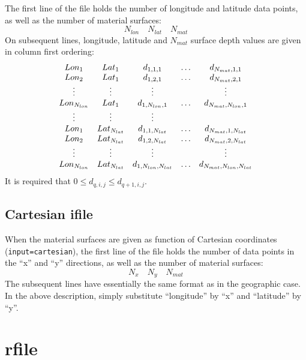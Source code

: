 \documentclass[11pt]{report}
\begin{document}
{The first line of the file holds the number of longitude and latitude data points, as well as the number
of material surfaces:
\[
	N_{lon}\quad N_{lat}\quad N_{mat}
\]
On subsequent lines, longitude, latitude and $N_{mat}$ surface depth values are given in column
first ordering:
\[
	\begin{array}{c c c c c}
		Lon_1         & Lat_1         & d_{1,1,1}             & \ldots & d_{N_{mat},1,1}             \\
		Lon_2         & Lat_1         & d_{1,2,1}             & \ldots & d_{N_{mat},2,1}             \\
		\vdots        & \vdots        & \vdots                &        & \vdots                      \\
		Lon_{N_{lon}} & Lat_1         & d_{1,N_{lon},1}       & \ldots & d_{N_{mat},N_{lon},1}       \\
		\vdots        & \vdots        & \vdots                                                       \\
		Lon_1         & Lat_{N_{lat}} & d_{1,1,N_{lat}}       & \ldots & d_{N_{mat},1,N_{lat}}       \\
		Lon_2         & Lat_{N_{lat}} & d_{1,2,N_{lat}}       & \ldots & d_{N_{mat},2,N_{lat}}       \\
		\vdots        & \vdots        & \vdots                &        & \vdots                      \\
		Lon_{N_{lon}} & Lat_{N_{lat}} & d_{1,N_{lon},N_{lat}} & \ldots & d_{N_{mat},N_{lon},N_{lat}}
	\end{array}
\]
It is required that $0\leq d_{q,i,j} \leq d_{q+1,i,j}$.

\subsection{Cartesian ifile}

When the material surfaces are given as function of Cartesian coordinates (\verb+input=cartesian+),
the first line of the file holds the number of data points in the ``x'' and ``y'' directions, as
well as the number of material surfaces:
\[
	N_{x}\quad N_{y}\quad N_{mat}
\]
The subsequent lines have essentially the same format as in the geographic case. In the above
description, simply substitute ``longitude'' by ``x'' and ``latitude'' by ``y''.


\section{rfile}\label{sec:rfile-format}

}
\end{document}
